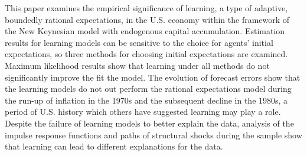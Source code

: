 This paper examines the empirical significance of learning, a type of adaptive, boundedly rational expectations, in the U.S. economy within the framework of the New Keynesian model with endogenous capital accumulation.  Estimation results for learning models can be sensitive to the choice for agents' initial expectations, so three methods for choosing initial expectations are examined.  Maximum likelihood results show that learning under all methods do not significantly improve the fit the model.  The evolution of forecast errors show that the learning models do not out perform the rational expectations model during the run-up of inflation in the 1970s and the subsequent decline in the 1980s, a period of U.S. history which others have suggested learning may play a role.  Despite the failure of learning models to better explain the data, analysis of the impulse response functions and paths of structural shocks during the sample show that learning can lead to different explanations for the data.